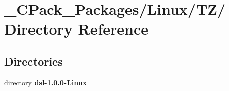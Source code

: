 \section{\_\-CPack\_\-Packages/Linux/TZ/ Directory Reference}
\label{dir_d7dd51b5d8bec5d1b90b567534d962ce}
\subsection*{Directories}
\begin{DoxyCompactItemize}
\item 
directory {\bf dsl-\/1.0.0-\/Linux}
\end{DoxyCompactItemize}
